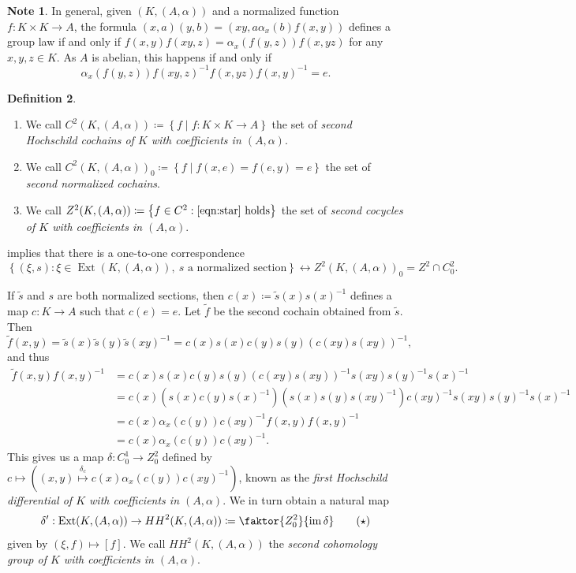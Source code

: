 \documentclass[10pt,letterpaper,cm]{nupset}
\theoremstyle{definition}
\newtheorem{definition}{Definition}[subsection]
\newtheorem{note}[definition]{Note}
\theoremstyle{theorem}
\theoremstyle{remark}
\newcommand{\1}{\mathbf{1}}
\newcommand{\0}{\vec 0}
\DeclareMathOperator{\ext}{Ext}
\DeclareMathOperator{\im}{im}
\begin{document}
\begin{note}\label{lr}
In general, given $\left(K, \left(A, \alpha\right)\right)$ and a normalized function $f: K \times K \to A$, the formula $(x, a)(y, b) = (xy, a \alpha_x(b)f(x,y))$ defines a group law if and only if $f(x,y)f(xy, z) = \alpha_x(f(y,z))f(x, yz)$ for any $x, y, z \in K$. As $A$ is abelian, this happens if and only if  
\[ \label{eqn:star}
\alpha_x(f(y, z))f(xy, z)^{-1} f(x, yz)f(x, y)^{-1} = e. \tag{$\ast$}
\]
\end{note}

\begin{definition} $ $
\begin{enumerate}
\item We call $C^2(K, (A, \alpha))\coloneqq  \left\{f \mid f: K \times K \to A\right\}$ the set of \textit{second Hochschild cochains of $K$ with coefficients in $(A, \alpha)$}. 
\item We call $C^2(K, (A, \alpha))_0 \coloneqq  \left\{f \mid f(x, e) = f(e, y) =e\right\}$ the set of \textit{second normalized cochains}.
\item We call $Z^2(K, (A, \alpha)) \coloneqq  \left\{f \in C^2 : \eqref{eqn:star} \text{ holds}\right\}$ the set of \textit{second cocycles of $K$ with coefficients in $(A, \alpha)$}.
\end{enumerate}
\end{definition}


 implies that there is a one-to-one correspondence 
\[
\left\{(\xi, s) : \xi \in \ext(K, (A, \alpha)), \ s \text{ a normalized section}\right\} \longleftrightarrow Z^2(K, (A, \alpha))_0 = Z^2 \cap C^2_0
.\]

If $\tilde{s}$ and $s$ are both normalized sections, then $c(x)\coloneqq \tilde{s}(x)s(x)^{-1}$ defines a map $c : K \to A$ such that $c(e) =e$. Let $\tilde{f}$ be the second cochain obtained from $\tilde{s}$. Then  $$\tilde{f}(x, y) = \tilde{s}(x)\tilde{s}(y)\tilde{s}(xy)^{-1} =c(x)s(x)c(y)s(y)(c(xy)s(xy))^{-1}, $$ and thus 
\begin{align*} \tilde{f}(x, y)f(x,y)^{-1} & = c(x)s(x)c(y)s(y)(c(xy)s(xy))^{-1}s(xy)s(y)^{-1}s(x)^{-1}
\\ &  = c(x)(s(x)c(y)s(x)^{-1})(s(x)s(y)s(xy)^{-1})c(xy)^{-1}s(xy)s(y)^{-1}s(x)^{-1}
\\ &  = c(x)\alpha_x(c(y))c(xy)^{-1}f(x,y)f(x,y)^{-1} 
\\ & =c(x)\alpha_x(c(y))c(xy)^{-1}.
\end{align*}
This gives us a map $\delta: C^1_0 \to Z^2_0$ defined by $c \mapsto \left((x, y) \overset{\delta_c}{\longmapsto}   c(x)\alpha_x(c(y))c(xy)^{-1}\right)$, known as the \textit{first Hochschild differential of $K$ with coefficients in $(A, \alpha)$}.  
We in turn obtain a natural map 
\[\label{eqn:HH}
\delta': \ext(K, (A, \alpha)) \to {HH}^2(K, (A, \alpha)) \coloneqq  \faktor{Z^2_0}{\im{\delta}}
\tag{$\star$}
\] given by $(\xi, f) \mapsto [f]$. We call ${HH}^2(K, (A, \alpha))$ the \textit{second cohomology group of $K$ with coefficients in $(A, \alpha)$}.
\end{document}
